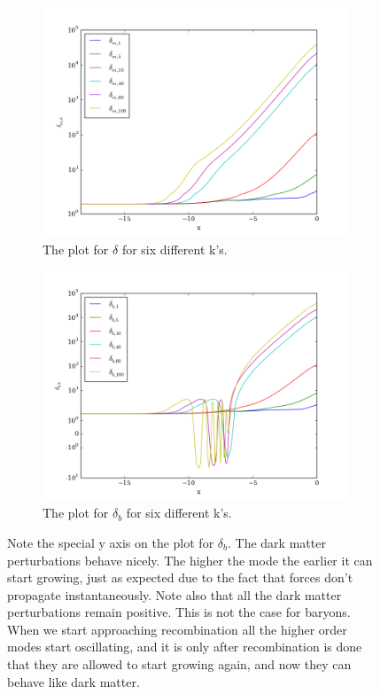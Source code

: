 \documentclass[a4paper]{report}
\begin{document}
\begin{figure}[ht]
\begin{subfigure}{.5\textwidth}
  \includegraphics[width=\textwidth]{delta.png}
 \caption{The plot for $\delta$ for six different k's.}
 \label{fig:delta}
\end{subfigure}
\begin{subfigure}{.5\textwidth}
\includegraphics[width=\textwidth]{deltab.png}
 \caption{The plot for $\delta_b$ for six different k's.}
 \label{fig:deltab}
\end{subfigure}
\caption{Note the special y axis on the plot for $\delta_b$. The dark matter perturbations behave nicely. The higher the mode the earlier it can start growing, just as expected due to the fact that forces don't propagate instantaneously. Note also that all the dark matter perturbations remain positive. This is not the case for baryons. When we start approaching recombination all the higher order modes start oscillating, and it is only after recombination is done that they are allowed to start growing again, and now they can behave like dark matter.}
\end{figure}
\end{document}
